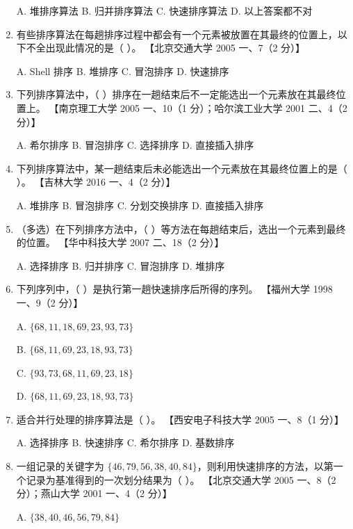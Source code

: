 \documentclass[lang=cn,newtx,10pt,scheme=chinese]{../../elegantbook}
\begin{document}
\begin{enumerate}
    A. 堆排序算法 \quad B. 归并排序算法 \quad C. 快速排序算法 \quad D. 以上答案都不对  

    \item 有些排序算法在每趟排序过程中都会有一个元素被放置在其最终的位置上，以下不全出现此情况的是（ ）。  
    【北京交通大学 2005 一、7（2 分）】  

    A. Shell 排序 \quad B. 堆排序 \quad C. 冒泡排序 \quad D. 快速排序  

    \item 下列排序算法中，（ ）排序在一趟结束后不一定能选出一个元素放在其最终位置上。  
    【南京理工大学 2005 一、10（1 分）；哈尔滨工业大学 2001 二、4（2 分）】  

    A. 希尔排序 \quad B. 冒泡排序 \quad C. 选择排序 \quad D. 直接插入排序  

    \item 下列排序算法中，某一趟结束后未必能选出一个元素放在其最终位置上的是（ ）。  
    【吉林大学 2016 一、4（2 分）】 

    A. 堆排序 \quad B. 冒泡排序 \quad C. 分划交换排序 \quad D. 直接插入排序  

    \item （多选）在下列排序方法中，（ ）等方法在每趟结束后，选出一个元素到最终的位置。  
    【华中科技大学 2007 二、18（2 分）】  

    A. 选择排序 \quad B. 归并排序 \quad C. 冒泡排序 \quad D. 堆排序  

    \item 下列序列中，（ ）是执行第一趟快速排序后所得的序列。  
    【福州大学 1998 一、9（2 分）】 

    A. $\{68, 11, 18, 69, 23, 93, 73\}$  

    B. $\{68, 11, 69, 23, 18, 93, 73\}$ 

    C. $\{93, 73, 68, 11, 69, 23, 18\}$  

    D. $\{68, 11, 69, 23, 18, 93, 73\}$  

    \item 适合并行处理的排序算法是（ ）。  
    【西安电子科技大学 2005 一、8（1 分）】  

    A. 选择排序 \quad B. 快速排序 \quad C. 希尔排序 \quad D. 基数排序  

    \item 一组记录的关键字为 $\{46, 79, 56, 38, 40, 84\}$，则利用快速排序的方法，以第一个记录为基准得到的一次划分结果为（ ）。  
    【北京交通大学 2005 一、8（2 分）；燕山大学 2001 一、4（2 分）】  

    A. $\{38, 40, 46, 56, 79, 84\}$  


\end{enumerate}
\end{document}
